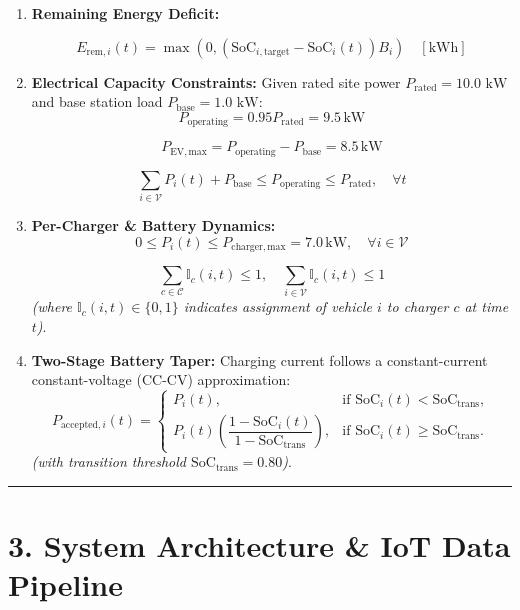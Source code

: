 \documentclass[
]{article}
\begin{document}
\begin{enumerate}
\def\labelenumi{\arabic{enumi}.}
\item
  \textbf{Remaining Energy Deficit:}

  \[E_{\mathrm{rem},i}(t) = \max\left(0, \left(\mathrm{SoC}_{i,\mathrm{target}} - \mathrm{SoC}_i(t)\right)B_i\right) \quad [\mathrm{kWh}]\]
\item
  \textbf{Electrical Capacity Constraints:} Given rated site power
  \(P_{\text{rated}} = 10.0\text{ kW}\) and base station load
  \(P_{\text{base}} = 1.0\text{ kW}\):
  \[P_{\mathrm{operating}} = 0.95 P_{\mathrm{rated}} = 9.5\,\mathrm{kW}\]

  \[P_{\mathrm{EV,max}} = P_{\mathrm{operating}} - P_{\mathrm{base}} = 8.5\,\mathrm{kW}\]

  \[\sum_{i \in \mathcal{V}} P_i(t) + P_{\mathrm{base}} \leq P_{\mathrm{operating}} \leq P_{\mathrm{rated}}, \quad \forall t\]
\item
  \textbf{Per-Charger \& Battery Dynamics:}
  \[0 \leq P_i(t) \leq P_{\mathrm{charger,max}} = 7.0\,\mathrm{kW}, \quad \forall i \in \mathcal{V}\]

  \[\sum_{c \in \mathcal{C}} \mathbb{I}_{c}(i,t) \leq 1, \quad \sum_{i \in \mathcal{V}} \mathbb{I}_{c}(i,t) \leq 1\]
  \emph{(where \(\mathbb{I}_{c}(i, t) \in \{0, 1\}\) indicates
  assignment of vehicle \(i\) to charger \(c\) at time \(t\))}.
\item
  \textbf{Two-Stage Battery Taper:} Charging current follows a
  constant-current constant-voltage (CC-CV) approximation:
  \[P_{\mathrm{accepted},i}(t) =
  \begin{cases}
  P_i(t), & \text{if } \mathrm{SoC}_i(t) < \mathrm{SoC}_{\mathrm{trans}}, \\
  P_i(t)\left(\dfrac{1 - \mathrm{SoC}_i(t)}{1 - \mathrm{SoC}_{\mathrm{trans}}}\right), & \text{if } \mathrm{SoC}_i(t) \geq \mathrm{SoC}_{\mathrm{trans}}.
  \end{cases}\] \emph{(with transition threshold
  \(\text{SoC}_{\text{trans}} = 0.80\))}.
\end{enumerate}

\vspace{0.5em}\noindent\textcolor{gridsenseblue}{\rule{\linewidth}{0.6pt}}\vspace{0.5em}

\section{3. System Architecture \& IoT Data
Pipeline}\label{system-architecture-iot-data-pipeline}
\end{document}
